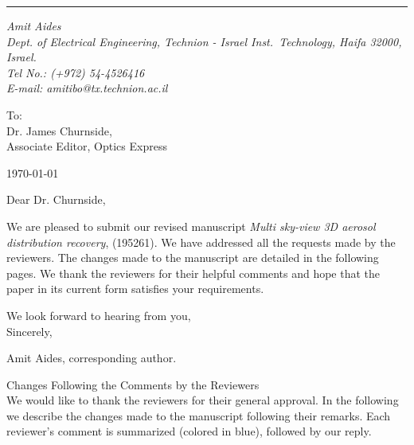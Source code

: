 \documentclass[12pt]{article}
\begin{document}

\vspace*{.5cm} \hrule

\def\sender{
  \it{Amit Aides}\\
  \scriptsize{Dept. of Electrical Engineering, Technion - Israel Inst.~Technology, Haifa 32000, Israel.}\\
  \scriptsize{Tel No.: (+972) 54-4526416}\hspace{5pt}\\
  \scriptsize{E-mail: amitibo@tx.technion.ac.il} } {\sender}

\vspace{0.5cm}
\noindent
To:\\
Dr. James Churnside,\\
Associate Editor, Optics Express\\[0.6cm]

\begin{flushright}
  \today
\end{flushright}

\vspace{0.3cm} \noindent

Dear Dr. Churnside,

We are pleased to submit our revised manuscript {\em Multi sky-view 3D
  aerosol distribution recovery}, (195261).  We have addressed all the
requests made by the reviewers. The changes made to the manuscript are
detailed in the following pages. We thank the reviewers for their
helpful comments and hope that the paper in its current form satisfies
your requirements.

We look forward to hearing from you,\\

\vspace{0.2cm} Sincerely,

\vspace{0.6cm}
Amit Aides, corresponding author.\\

\newpage

{\Large Changes Following the Comments by the Reviewers}\\

We would like to thank the reviewers for their general approval. In
the following we describe the changes made to the manuscript following
their remarks. Each reviewer's comment is summarized (colored in
blue), followed by our reply.
\end{document}
